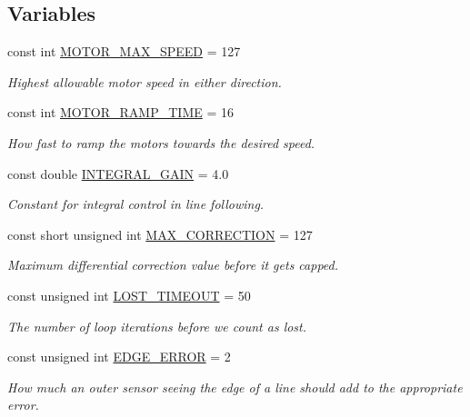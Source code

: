 \subsection*{Variables}
\begin{DoxyCompactItemize}
\item 
const int \hyperlink{namespaceIDP_a4ead0b21ad2c507b542445695182d4cd}{MOTOR\_\-MAX\_\-SPEED} = 127
\begin{DoxyCompactList}\small\item\em Highest allowable motor speed in either direction. \item\end{DoxyCompactList}\item 
const int \hyperlink{namespaceIDP_ab3a00a6cc8a6dba271e38d337daf4703}{MOTOR\_\-RAMP\_\-TIME} = 16
\begin{DoxyCompactList}\small\item\em How fast to ramp the motors towards the desired speed. \item\end{DoxyCompactList}\item 
const double \hyperlink{namespaceIDP_a9107eef10d68ba30176633afd87f1ed4}{INTEGRAL\_\-GAIN} = 4.0
\begin{DoxyCompactList}\small\item\em Constant for integral control in line following. \item\end{DoxyCompactList}\item 
const short unsigned int \hyperlink{namespaceIDP_a246919caaacabcb0399802d542d8330b}{MAX\_\-CORRECTION} = 127
\begin{DoxyCompactList}\small\item\em Maximum differential correction value before it gets capped. \item\end{DoxyCompactList}\item 
const unsigned int \hyperlink{namespaceIDP_ac845248570cca0705d43e2dbb085c3cb}{LOST\_\-TIMEOUT} = 50
\begin{DoxyCompactList}\small\item\em The number of loop iterations before we count as lost. \item\end{DoxyCompactList}\item 
const unsigned int \hyperlink{namespaceIDP_afa01378acc238f4bd41d8eb304f7afd7}{EDGE\_\-ERROR} = 2
\begin{DoxyCompactList}\small\item\em How much an outer sensor seeing the edge of a line should add to the appropriate error. \item\end{DoxyCompactList}\item 

\end{DoxyCompactItemize}
